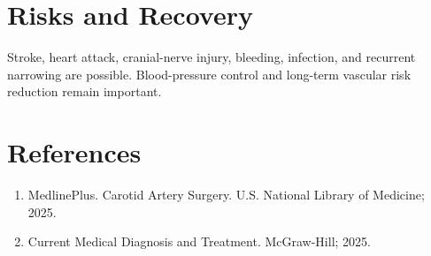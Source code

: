 \section*{Risks and Recovery}
Stroke, heart attack, cranial-nerve injury, bleeding, infection, and recurrent narrowing are possible. Blood-pressure control and long-term vascular risk reduction remain important.
\section*{References}
\begin{enumerate}\item MedlinePlus. Carotid Artery Surgery. U.S. National Library of Medicine; 2025.\item Current Medical Diagnosis and Treatment. McGraw-Hill; 2025.\end{enumerate}
\clearpage
